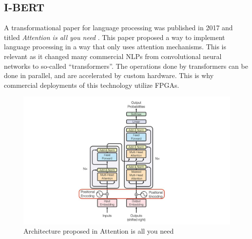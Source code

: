 \documentclass[12pt]{article}
\begin{document}
	\subsection{I-BERT}
	A transformational paper for language processing was published in 2017 and titled \textit{Attention is all you need} \cite{attention}. This paper proposed a way to implement language processing in a way that only uses attention mechanisms. This is relevant as it changed many commercial NLPs from convolutional neural networks to so-called “transformers”. The operations done by transformers can be done in parallel, and are accelerated by custom hardware. This is why commercial deployments of this technology utilize FPGAs. 
\begin{figure}[h!]
	\centering
	\includegraphics[width=\linewidth]{figures/topology.png}
	\caption{Architecture proposed in Attention is all you need \cite{attention}}
	\label{fig:topology}
\end{figure}	
	
\end{document}
